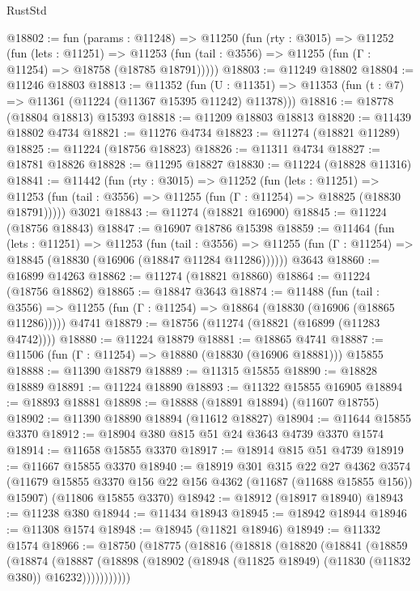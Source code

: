 \begin{lexlean}{RustStd}
\begin{coremodule}
@18802 := fun (params : @11248) =>
  @11250
    (fun (rty : @3015) =>
    @11252
      (fun (lets : @11251) =>
      @11253 (fun (tail : @3556) => @11255 (fun (Γ : @11254) => @18758 (@18785 @18791)))))
@18803 := @11249 @18802
@18804 := @11246 @18803
@18813 := @11352
    (fun (U : @11351) => @11353 (fun (t : @7) => @11361 (@11224 (@11367 @15395 @11242) @11378)))
@18816 := @18778 (@18804 @18813) @15393
@18818 := @11209 @18803 @18813
@18820 := @11439 @18802 @4734
@18821 := @11276 @4734
@18823 := @11274 (@18821 @11289)
@18825 := @11224 (@18756 @18823)
@18826 := @11311 @4734
@18827 := @18781 @18826
@18828 := @11295 @18827
@18830 := @11224 (@18828 @11316)
@18841 := @11442
    (fun (rty : @3015) =>
    @11252
      (fun (lets : @11251) =>
      @11253 (fun (tail : @3556) => @11255 (fun (Γ : @11254) => @18825 (@18830 @18791)))))
    @3021
@18843 := @11274 (@18821 @16900)
@18845 := @11224 (@18756 @18843)
@18847 := @16907 @18786 @15398
@18859 := @11464
    (fun (lets : @11251) =>
    @11253
      (fun (tail : @3556) =>
      @11255 (fun (Γ : @11254) => @18845 (@18830 (@16906 (@18847 @11284 @11286))))))
    @3643
@18860 := @16899 @14263
@18862 := @11274 (@18821 @18860)
@18864 := @11224 (@18756 @18862)
@18865 := @18847 @3643
@18874 := @11488
    (fun (tail : @3556) => @11255 (fun (Γ : @11254) => @18864 (@18830 (@16906 (@18865 @11286)))))
    @4741
@18879 := @18756 (@11274 (@18821 (@16899 (@11283 @4742))))
@18880 := @11224 @18879
@18881 := @18865 @4741
@18887 := @11506 (fun (Γ : @11254) => @18880 (@18830 (@16906 @18881))) @15855
@18888 := @11390 @18879
@18889 := @11315 @15855
@18890 := @18828 @18889
@18891 := @11224 @18890
@18893 := @11322 @15855 @16905
@18894 := @18893 @18881
@18898 := @18888 (@18891 @18894) (@11607 @18755)
@18902 := @11390 @18890 @18894 (@11612 @18827)
@18904 := @11644 @15855 @3370
@18912 := @18904 @380 @815 @51 @24 @3643 @4739 @3370 @1574
@18914 := @11658 @15855 @3370
@18917 := @18914 @815 @51 @4739
@18919 := @11667 @15855 @3370
@18940 := @18919
    @301
    @315
    @22
    @27
    @4362
    @3574
    (@11679 @15855 @3370 @156 @22 @156 @4362 (@11687 (@11688 @15855 @156)) @15907)
    (@11806 @15855 @3370)
@18942 := @18912 (@18917 @18940)
@18943 := @11238 @380
@18944 := @11434 @18943
@18945 := @18942 @18944
@18946 := @11308 @1574
@18948 := @18945 (@11821 @18946)
@18949 := @11332 @1574
@18966 := @18750
    (@18775
      (@18816
        (@18818
          (@18820
            (@18841
              (@18859
                (@18874
                  (@18887
                    (@18898 (@18902 (@18948 (@11825 @18949) (@11830 (@11832 @380)) @16232)))))))))))

\end{coremodule}
\end{lexlean}
